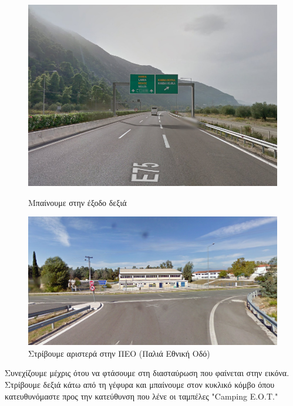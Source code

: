 \begin{figure}[H]
	\centering
		\includegraphics[width=\textwidth]{images/athina-lamia/lamia/lamia1.PNG}
			\caption{Μπαίνουμε στην έξοδο δεξιά}

	\centering
		\includegraphics[width=\textwidth]{images/athina-lamia/lamia/lamia2.PNG}
			\caption{Στρίβουμε αριστερά στην ΠΕΟ (Παλιά Εθνική Οδό)}
\end{figure}
Συνεχίζουμε μέχρις ότου να φτάσουμε στη διασταύρωση που φαίνεται στην εικόνα. Στρίβουμε δεξιά κάτω από τη γέφυρα και μπαίνουμε στον κυκλικό κόμβο όπου κατευθυνόμαστε προς την κατεύθυνση που λένε οι ταμπέλες "Camping Ε.Ο.Τ."
